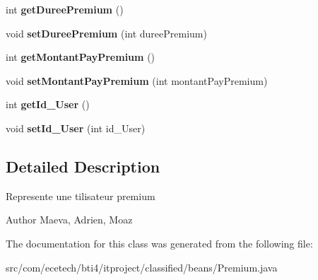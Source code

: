 \begin{DoxyCompactItemize}
\item 
int {\bfseries get\+Duree\+Premium} ()\hypertarget{classcom_1_1ecetech_1_1bti4_1_1itproject_1_1classified_1_1beans_1_1_premium_ad1f3a1e6d4c457eb09092a7ae4dbc6c9}{}\label{classcom_1_1ecetech_1_1bti4_1_1itproject_1_1classified_1_1beans_1_1_premium_ad1f3a1e6d4c457eb09092a7ae4dbc6c9}

\item 
void {\bfseries set\+Duree\+Premium} (int duree\+Premium)\hypertarget{classcom_1_1ecetech_1_1bti4_1_1itproject_1_1classified_1_1beans_1_1_premium_a17decfd8474e6777ead78ef654c73073}{}\label{classcom_1_1ecetech_1_1bti4_1_1itproject_1_1classified_1_1beans_1_1_premium_a17decfd8474e6777ead78ef654c73073}

\item 
int {\bfseries get\+Montant\+Pay\+Premium} ()\hypertarget{classcom_1_1ecetech_1_1bti4_1_1itproject_1_1classified_1_1beans_1_1_premium_ac92e855f8b79c6092c2bfc58bc5766a4}{}\label{classcom_1_1ecetech_1_1bti4_1_1itproject_1_1classified_1_1beans_1_1_premium_ac92e855f8b79c6092c2bfc58bc5766a4}

\item 
void {\bfseries set\+Montant\+Pay\+Premium} (int montant\+Pay\+Premium)\hypertarget{classcom_1_1ecetech_1_1bti4_1_1itproject_1_1classified_1_1beans_1_1_premium_a38ac15382e11bd85af3a90e3cde78e73}{}\label{classcom_1_1ecetech_1_1bti4_1_1itproject_1_1classified_1_1beans_1_1_premium_a38ac15382e11bd85af3a90e3cde78e73}

\item 
int {\bfseries get\+Id\+\_\+\+User} ()\hypertarget{classcom_1_1ecetech_1_1bti4_1_1itproject_1_1classified_1_1beans_1_1_premium_a50b0c0ac4495738df4c6d21c1148f053}{}\label{classcom_1_1ecetech_1_1bti4_1_1itproject_1_1classified_1_1beans_1_1_premium_a50b0c0ac4495738df4c6d21c1148f053}

\item 
void {\bfseries set\+Id\+\_\+\+User} (int id\+\_\+\+User)\hypertarget{classcom_1_1ecetech_1_1bti4_1_1itproject_1_1classified_1_1beans_1_1_premium_addc3ed1f76ce56f118b2b7be1d88182a}{}\label{classcom_1_1ecetech_1_1bti4_1_1itproject_1_1classified_1_1beans_1_1_premium_addc3ed1f76ce56f118b2b7be1d88182a}

\end{DoxyCompactItemize}


\subsection{Detailed Description}
Represente une tilisateur premium \begin{DoxyAuthor}{Author}
Maeva, Adrien, Moaz 
\end{DoxyAuthor}


The documentation for this class was generated from the following file\+:\begin{DoxyCompactItemize}
\item 
src/com/ecetech/bti4/itproject/classified/beans/Premium.\+java\end{DoxyCompactItemize}
